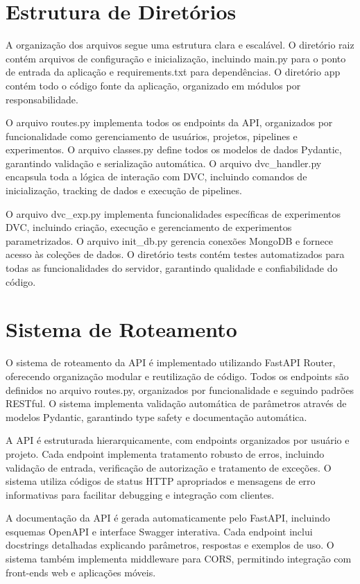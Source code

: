 \documentclass[12pt,a4paper]{article}
\begin{document}
\section{Estrutura de Diretórios}

A organização dos arquivos segue uma estrutura clara e escalável. O diretório raiz contém arquivos de configuração e inicialização, incluindo main.py para o ponto de entrada da aplicação e requirements.txt para dependências. O diretório app contém todo o código fonte da aplicação, organizado em módulos por responsabilidade.

O arquivo routes.py implementa todos os endpoints da API, organizados por funcionalidade como gerenciamento de usuários, projetos, pipelines e experimentos. O arquivo classes.py define todos os modelos de dados Pydantic, garantindo validação e serialização automática. O arquivo dvc_handler.py encapsula toda a lógica de interação com DVC, incluindo comandos de inicialização, tracking de dados e execução de pipelines.

O arquivo dvc_exp.py implementa funcionalidades específicas de experimentos DVC, incluindo criação, execução e gerenciamento de experimentos parametrizados. O arquivo init_db.py gerencia conexões MongoDB e fornece acesso às coleções de dados. O diretório tests contém testes automatizados para todas as funcionalidades do servidor, garantindo qualidade e confiabilidade do código.

\section{Sistema de Roteamento}

O sistema de roteamento da API é implementado utilizando FastAPI Router, oferecendo organização modular e reutilização de código. Todos os endpoints são definidos no arquivo routes.py, organizados por funcionalidade e seguindo padrões RESTful. O sistema implementa validação automática de parâmetros através de modelos Pydantic, garantindo type safety e documentação automática.

A API é estruturada hierarquicamente, com endpoints organizados por usuário e projeto. Cada endpoint implementa tratamento robusto de erros, incluindo validação de entrada, verificação de autorização e tratamento de exceções. O sistema utiliza códigos de status HTTP apropriados e mensagens de erro informativas para facilitar debugging e integração com clientes.

A documentação da API é gerada automaticamente pelo FastAPI, incluindo esquemas OpenAPI e interface Swagger interativa. Cada endpoint inclui docstrings detalhadas explicando parâmetros, respostas e exemplos de uso. O sistema também implementa middleware para CORS, permitindo integração com front-ends web e aplicações móveis.
\end{document}
